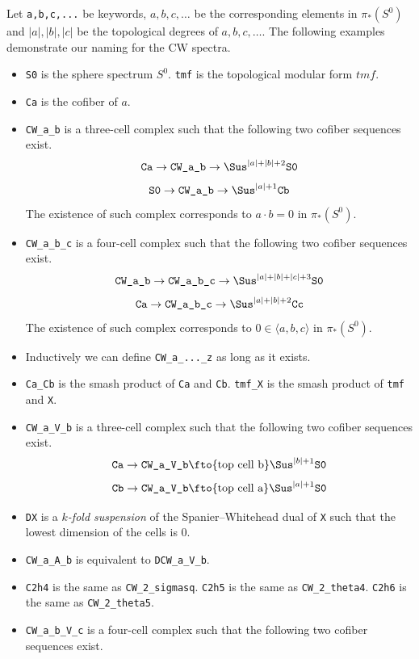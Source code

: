 \documentclass{amsart}
\numberwithin{equation}{section}
\begin{document}
\begin{notation}
    Let \texttt{a,b,c,...} be keywords, $a,b,c,\dots$ be the corresponding elements in $\pi_*(S^0)$ and $|a|,|b|,|c|$ be the topological degrees of $a,b,c,\dots$. The following examples demonstrate our naming for the CW spectra.
    \begin{itemize}
        \item \verb|S0| is the sphere spectrum $S^0$. \verb|tmf| is the topological modular form $tmf$.
        \item \texttt{Ca} is the cofiber of $a$.
        \item \texttt{CW\_a\_b} is a three-cell complex such that the following two cofiber sequences exist.
        $$\texttt{Ca}\to  \texttt{CW\_a\_b}\to \Sus^{|a|+|b|+2}\verb|S0|$$
        $$\verb|S0|\to  \texttt{CW\_a\_b}\to \Sus^{|a|+1}\texttt{Cb}$$
        The existence of such complex corresponds to $a\cdot b=0$ in $\pi_*(S^0)$.
        \item \texttt{CW\_a\_b\_c} is a four-cell complex such that the following two cofiber sequences exist.
        $$\texttt{CW\_a\_b}\to  \texttt{CW\_a\_b\_c}\to \Sus^{|a|+|b|+|c|+3}\verb|S0|$$
        $$\texttt{Ca}\to  \texttt{CW\_a\_b\_c}\to \Sus^{|a|+|b|+2}\texttt{Cc}$$
        The existence of such complex corresponds to $0\in \langle a, b, c\rangle$ in $\pi_*(S^0)$.
        \item Inductively we can define \verb|CW_a_..._z| as long as it exists.
        \item \verb|Ca_Cb| is the smash product of \texttt{Ca} and \texttt{Cb}. \verb|tmf_X| is the smash product of \verb|tmf| and \verb|X|.
        \item \verb|CW_a_V_b| is a three-cell complex such that the following two cofiber sequences exist.
        $$\verb|Ca|\to \verb|CW_a_V_b|\fto{\text{top cell b}} \Sus^{|b|+1}\verb|S0|$$
        $$\verb|Cb|\to \verb|CW_a_V_b|\fto{\text{top cell a}} \Sus^{|a|+1}\verb|S0|$$
        \item \verb|DX| is a \emph{$k$-fold suspension} of the Spanier–Whitehead dual of \verb|X| such that the lowest dimension of the cells is $0$.
        \item \verb|CW_a_A_b| is equivalent to \verb|DCW_a_V_b|.
        \item \verb|C2h4| is the same as \verb|CW_2_sigmasq|. \verb|C2h5| is the same as \verb|CW_2_theta4|.  \verb|C2h6| is the same as \verb|CW_2_theta5|.
        \item \verb|CW_a_b_V_c| is a four-cell complex such that the following two cofiber sequences exist.

\end{itemize}
\end{notation}
\end{document}
